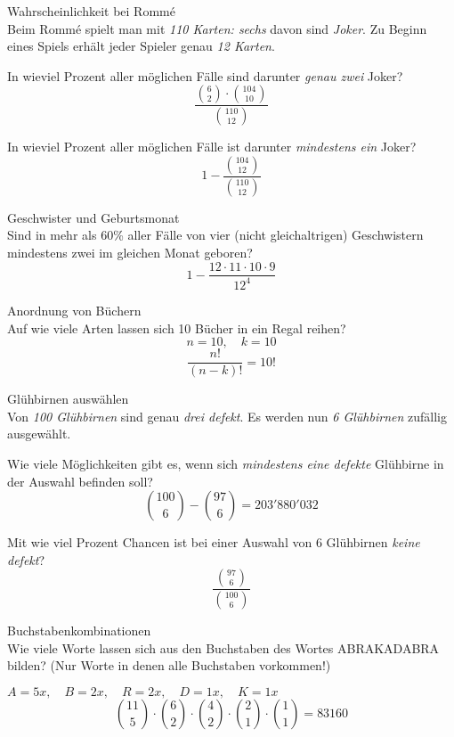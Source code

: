 \begin{example}{Wahrscheinlichkeit bei Rommé}\\
Beim Rommé spielt man mit \emph{110 Karten: sechs} davon sind \emph{Joker}. Zu Beginn eines Spiels erhält jeder Spieler genau \emph{12 Karten}.

In wieviel Prozent aller möglichen Fälle sind darunter \emph{genau zwei} Joker?
$$\frac{\binom{6}{2} \cdot \binom{104}{10}}{\binom{110}{12}}$$

In wieviel Prozent aller möglichen Fälle ist darunter \emph{mindestens ein} Joker?
$$1 - \frac{\binom{104}{12}}{\binom{110}{12}}$$
\end{example}

\begin{example}{Geschwister und Geburtsmonat}\\
Sind in mehr als 60\% aller Fälle von vier (nicht gleichaltrigen) Geschwistern mindestens zwei im gleichen Monat geboren?
$$1 - \frac{12 \cdot 11 \cdot 10 \cdot 9}{12^4}$$
\end{example}

\begin{example}{Anordnung von Büchern}\\
Auf wie viele Arten lassen sich 10 Bücher in ein Regal reihen?
$$n = 10, \quad k = 10$$
$$\frac{n!}{(n-k)!} = 10!$$
\end{example}

\begin{example}{Glühbirnen auswählen}\\
Von \emph{100 Glühbirnen} sind genau \emph{drei defekt}. Es werden nun \emph{6 Glühbirnen} zufällig ausgewählt.

Wie viele Möglichkeiten gibt es, wenn sich \emph{mindestens eine defekte} Glühbirne in der Auswahl befinden soll?
$$\binom{100}{6} - \binom{97}{6} = 203'880'032$$

Mit wie viel Prozent Chancen ist bei einer Auswahl von 6 Glühbirnen \emph{keine defekt}?
$$\frac{\binom{97}{6}}{\binom{100}{6}}$$
\end{example}

\begin{example}{Buchstabenkombinationen}\\
Wie viele Worte lassen sich aus den Buchstaben des Wortes ABRAKADABRA bilden? (Nur Worte in denen alle Buchstaben vorkommen!)

$A = 5x, \quad B = 2x, \quad R = 2x, \quad D = 1x, \quad K = 1x$
$$\binom{11}{5} \cdot \binom{6}{2} \cdot \binom{4}{2} \cdot \binom{2}{1} \cdot \binom{1}{1} = 83160$$
\end{example}

